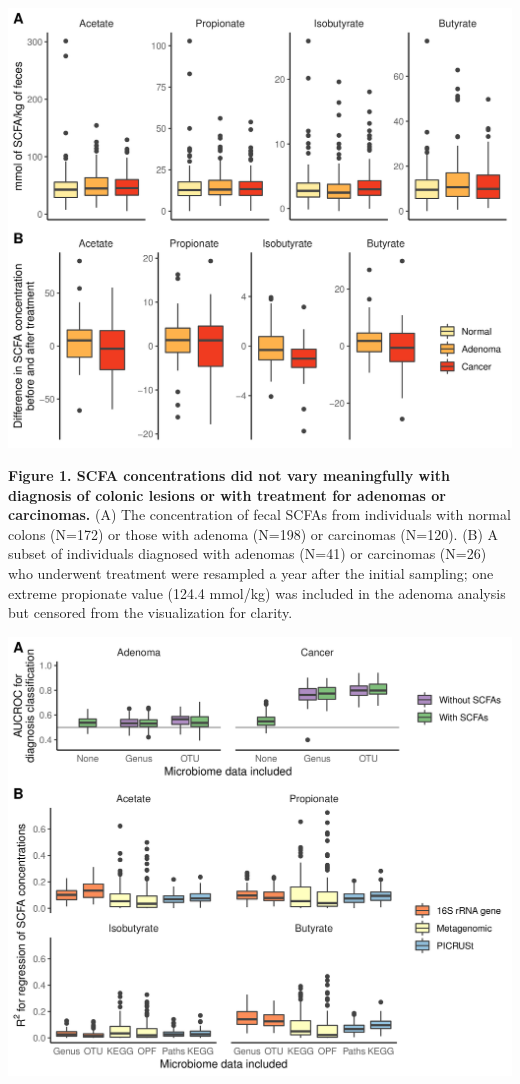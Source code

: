 \documentclass[11pt,]{article}
\begin{document}
\newpage

\includegraphics{figure_1.png}

\textbf{Figure 1. SCFA concentrations did not vary meaningfully with
diagnosis of colonic lesions or with treatment for adenomas or
carcinomas.} (A) The concentration of fecal SCFAs from individuals with
normal colons (N=172) or those with adenoma (N=198) or carcinomas
(N=120). (B) A subset of individuals diagnosed with adenomas (N=41) or
carcinomas (N=26) who underwent treatment were resampled a year after
the initial sampling; one extreme propionate value (124.4 mmol/kg) was
included in the adenoma analysis but censored from the visualization for
clarity.

\newpage

\includegraphics{figure_2.png}
\end{document}
